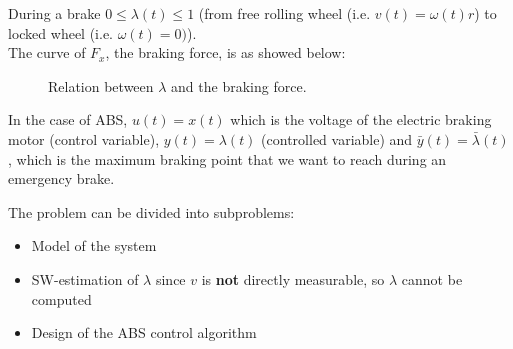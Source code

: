 During a brake $0 \le \lambda (t) \le 1$ (from free rolling wheel (i.e. $v(t) = \omega (t) r$) to locked wheel (i.e. $\omega(t) = 0)$).\\
The curve of $F_{x}$, the braking force, is as showed below:
\vspace{-3cm}
\begin{figure}[h!]
    \centering
    \caption*{Relation between $\lambda$ and the braking force.}
\end{figure}


In the case of ABS, $u(t) = x(t)$ which is the voltage of the electric braking motor (control variable), $y(t) = \lambda (t)$ (controlled variable) and $\bar{y}(t) = \bar{\lambda} (t)$, which is the maximum braking point that we want to reach during an emergency brake.

The problem can be divided into subproblems:
\begin{itemize}
    \item Model of the system
    \item SW-estimation of $\lambda$ since $v$ is \textbf{not} directly measurable, so $\lambda$ cannot be computed
    \item Design of the ABS control algorithm
\end{itemize}

